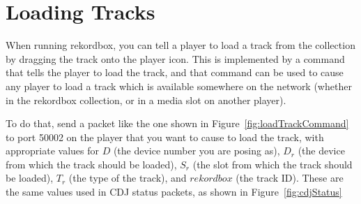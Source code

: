 \documentclass[11pt]{article}
\begin{document}
\section{Loading Tracks}

When running rekordbox, you can tell a player to load a track from the
collection by dragging the track onto the player icon. This is
implemented by a command that tells the player to load the track, and
that command can be used to cause any player to load a track which is
available somewhere on the network (whether in the rekordbox
collection, or in a media slot on another player).

To do that, send a packet like the one shown in
Figure~\ref{fig:loadTrackCommand} to port 50002 on the player that you
want to cause to load the track, with appropriate values for $D$ (the
device number you are posing as), $D_r$ (the device from which the
track should be loaded), $S_r$ (the slot from which the track should
be loaded), $T_r$ (the type of the track), and $rekordbox$ (the track
ID). These are the same values used in CDJ status packets, as shown in
Figure~\ref{fig:cdjStatus}
\end{document}
